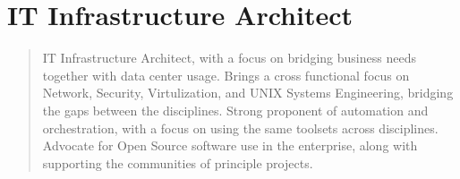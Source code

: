 \section*{IT Infrastructure Architect}
\begin{quote}
IT Infrastructure Architect, with a focus on bridging business needs together with data center usage. Brings a cross functional focus on Network, Security, Virtulization, and UNIX Systems Engineering, bridging the gaps between the disciplines. Strong proponent of automation and orchestration, with a focus on using the same toolsets across disciplines. Advocate for Open Source software use in the enterprise, along with supporting the communities of principle projects.
\end{quote}


